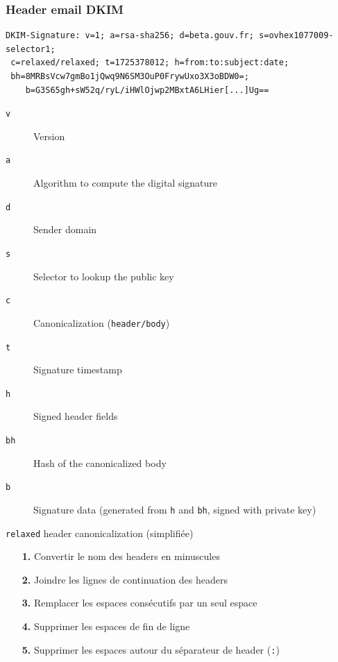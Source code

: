 \documentclass{beamer}
\begin{document}
\begin{frame}[fragile]
    \frametitle{Header email DKIM}

    \begin{verbatim}
DKIM-Signature: v=1; a=rsa-sha256; d=beta.gouv.fr; s=ovhex1077009-selector1;
 c=relaxed/relaxed; t=1725378012; h=from:to:subject:date;
 bh=8MRBsVcw7gmBo1jQwq9N6SM3OuP0FrywUxo3X3oBDW0=;
    b=G3S65gh+sW52q/ryL/iHWlOjwp2MBxtA6LHier[...]Ug==
    \end{verbatim}

    \begin{description}
        \item[\texttt{v}] Version
        \item[\texttt{a}] Algorithm to compute the digital signature
        \item[\texttt{d}] Sender domain
        \item[\texttt{s}] Selector to lookup the public key
        \item[\texttt{c}] Canonicalization (\texttt{header/body})
        \item[\texttt{t}] Signature timestamp
        \item[\texttt{h}] Signed header fields
        \item[\texttt{bh}] Hash of the canonicalized body
        \item[\texttt{b}] Signature data (generated from \texttt{h} and \texttt{bh}, signed with private key)
    \end{description}
\end{frame}

\begin{frame}{\texttt{relaxed} header canonicalization (simplifiée)}
    \begin{itemize}
        \item[\textbf{1.}] Convertir le nom des headers en minuscules
        \item[\textbf{2.}] Joindre les lignes de continuation des headers
        \item[\textbf{3.}] Remplacer les espaces consécutifs par un seul espace
        \item[\textbf{4.}] Supprimer les espaces de fin de ligne
        \item[\textbf{5.}] Supprimer les espaces autour du séparateur de header (\texttt{:})
    \end{itemize}
\end{frame}
\end{document}
